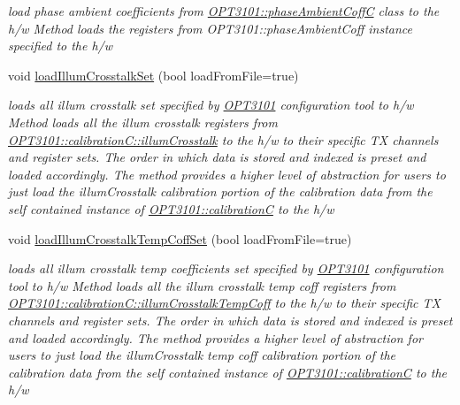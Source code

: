 \begin{DoxyCompactItemize}
\begin{DoxyCompactList}\small\item\em load phase ambient coefficients from \mbox{\hyperlink{class_o_p_t3101_1_1phase_ambient_coff_c}{O\+P\+T3101\+::phase\+Ambient\+CoffC}} class to the h/w Method loads the registers from O\+P\+T3101\+::phase\+Ambient\+Coff instance specified to the h/w \end{DoxyCompactList}\item 
void \mbox{\hyperlink{class_o_p_t3101_1_1device_a48b320dfe4376bf62043d10ba937e8cd}{load\+Illum\+Crosstalk\+Set}} (bool load\+From\+File=true)
\begin{DoxyCompactList}\small\item\em loads all illum crosstalk set specified by \mbox{\hyperlink{namespace_o_p_t3101}{O\+P\+T3101}} configuration tool to h/w Method loads all the illum crosstalk registers from \mbox{\hyperlink{class_o_p_t3101_1_1calibration_c_ac09121c7057093506de63d6e2ea3a4b7}{O\+P\+T3101\+::calibration\+C\+::illum\+Crosstalk}} to the h/w to their specific TX channels and register sets. The order in which data is stored and indexed is preset and loaded accordingly. The method provides a higher level of abstraction for users to just load the illum\+Crosstalk calibration portion of the calibration data from the self contained instance of \mbox{\hyperlink{class_o_p_t3101_1_1calibration_c}{O\+P\+T3101\+::calibrationC}} to the h/w \end{DoxyCompactList}\item 
void \mbox{\hyperlink{class_o_p_t3101_1_1device_ab384cacd80cd32643b7029fe59428e92}{load\+Illum\+Crosstalk\+Temp\+Coff\+Set}} (bool load\+From\+File=true)
\begin{DoxyCompactList}\small\item\em loads all illum crosstalk temp coefficients set specified by \mbox{\hyperlink{namespace_o_p_t3101}{O\+P\+T3101}} configuration tool to h/w Method loads all the illum crosstalk temp coff registers from \mbox{\hyperlink{class_o_p_t3101_1_1calibration_c_ac7bcc22317965bb378479fb016c20d3c}{O\+P\+T3101\+::calibration\+C\+::illum\+Crosstalk\+Temp\+Coff}} to the h/w to their specific TX channels and register sets. The order in which data is stored and indexed is preset and loaded accordingly. The method provides a higher level of abstraction for users to just load the illum\+Crosstalk temp coff calibration portion of the calibration data from the self contained instance of \mbox{\hyperlink{class_o_p_t3101_1_1calibration_c}{O\+P\+T3101\+::calibrationC}} to the h/w \end{DoxyCompactList}\item 

\end{DoxyCompactItemize}
